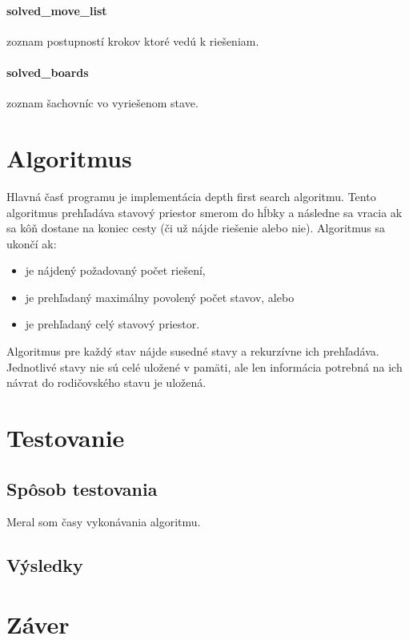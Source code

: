 \paragraph{solved\_move\_list}\label{par:solved-move-list} zoznam postupností
krokov ktoré vedú k riešeniam.

\paragraph{solved\_boards} zoznam šachovníc vo vyriešenom stave.

\section{Algoritmus}\label{sec:algoritmus}

Hlavná časť programu je implementácia depth first search algoritmu.
Tento algoritmus prehľadáva stavový priestor smerom do hĺbky a následne sa vracia
ak sa kôň dostane na koniec cesty (či už nájde riešenie alebo nie).
Algoritmus sa ukončí ak:
\begin{itemize}
    \item je nájdený požadovaný počet riešení,
    \item je prehľadaný maximálny povolený počet stavov, alebo
    \item je prehľadaný celý stavový priestor.
\end{itemize}

Algoritmus pre každý stav nájde susedné stavy a rekurzívne ich prehľadáva.
Jednotlivé stavy nie sú celé uložené v pamäti, ale len informácia potrebná na
ich návrat do rodičovského stavu je uložená.

\section{Testovanie}\label{sec:testovanie}

\subsection{Spôsob testovania}\label{subsec:spôsob-testovania}

Meral som časy vykonávania algoritmu.

\subsection{Výsledky}\label{subsec:výsledky}

\section{Záver}\label{sec:záver}







\endgroup